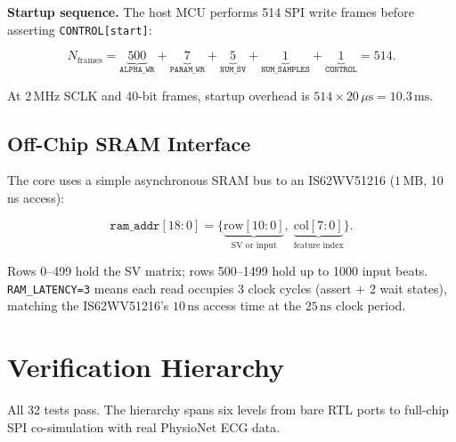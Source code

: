 \documentclass[11pt]{article}
\begin{document}
\noindent\textbf{Startup sequence.}  The host MCU performs 514 SPI write frames
before asserting \texttt{CONTROL[start]}:

\begin{equation}
  N_\text{frames} = \underbrace{500}_{\texttt{ALPHA\_WR}}
                  + \underbrace{7}_{\texttt{PARAM\_WR}}
                  + \underbrace{5}_{\texttt{NUM\_SV}}
                  + \underbrace{1}_{\texttt{NUM\_SAMPLES}}
                  + \underbrace{1}_{\texttt{CONTROL}}
                  = 514.
  \label{eq:frames}
\end{equation}

At 2\,MHz SCLK and 40-bit frames, startup overhead is $514 \times 20\,\mu\mathrm{s}
= 10.3\,\mathrm{ms}$.

\subsection{Off-Chip SRAM Interface}

The core uses a simple asynchronous SRAM bus to an IS62WV51216 ($1\,\mathrm{MB}$,
10\,ns access):

\begin{equation}
  \texttt{ram\_addr}[18:0] = \bigl\{\underbrace{\text{row}[10:0]}_{\text{SV or input}},\;
                              \underbrace{\text{col}[7:0]}_{\text{feature index}}\bigr\}.
  \label{eq:ram_addr}
\end{equation}

Rows 0--499 hold the SV matrix; rows 500--1499 hold up to 1000 input beats.
\texttt{RAM\_LATENCY=3} means each read occupies 3 clock cycles (assert
$+$ 2 wait states), matching the IS62WV51216's $10\,\mathrm{ns}$ access time
at the $25\,\mathrm{ns}$ clock period.

\section{Verification Hierarchy}

\noindent All 32 tests pass.  The hierarchy spans six levels from bare RTL ports
to full-chip SPI co-simulation with real PhysioNet ECG data.
\end{document}
